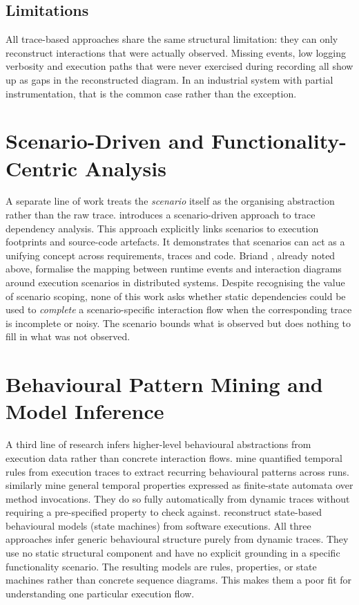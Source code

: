 \subsection{Limitations}

All trace-based approaches share the same structural limitation: they can only
reconstruct interactions that were actually observed.
Missing events, low logging verbosity and execution paths that were never
exercised during recording all show up as gaps in the reconstructed diagram.
In an industrial system with partial instrumentation, that is the common
case rather than the exception.

\section{Scenario-Driven and Functionality-Centric Analysis}

A separate line of work treats the \emph{scenario} itself as the organising
abstraction rather than the raw trace.
\textcite{egyed:scenario} introduces a scenario-driven approach to trace
dependency analysis. This approach explicitly links scenarios to execution footprints
and source-code artefacts. It demonstrates that scenarios can act as a unifying
concept across requirements, traces and code.
Briand \etal \cite{briand:seqdiag}, already noted above, formalise the
mapping between runtime
events and interaction diagrams around execution scenarios in distributed
systems.
Despite recognising the value of scenario scoping, none of this work asks
whether static dependencies could be used to \emph{complete} a scenario-specific
interaction flow when the corresponding trace is incomplete or noisy.
The scenario bounds what is observed but does nothing to fill in what was not observed.

\section{Behavioural Pattern Mining and Model Inference}

A third line of research infers higher-level behavioural abstractions from
execution data rather than concrete interaction flows.
\textcite{lo:temporalrules} mine quantified temporal rules from execution
traces to extract recurring behavioural patterns across runs.
\textcite{gabel:javert} similarly mine general temporal properties expressed
as finite-state automata over method invocations. They do so fully automatically
from dynamic traces without requiring a pre-specified property to check against.
\textcite{walkinshaw:statemachines} reconstruct state-based behavioural
models (state machines) from software executions.
All three approaches infer generic behavioural structure purely from dynamic
traces. They use no static structural component and have no explicit grounding
in a specific functionality scenario.
The resulting models are rules, properties, or state machines rather than
concrete sequence diagrams. This makes them a poor fit for understanding
one particular execution flow.

